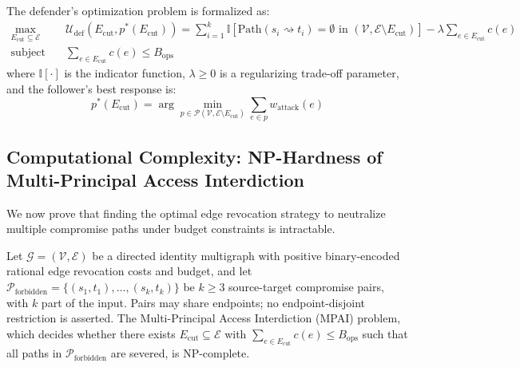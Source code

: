 The defender's optimization problem is formalized as:
\begin{align}
\max_{E_{\text{cut}} \subseteq \mathcal{E}} \quad & \mathcal{U}_{\text{def}}(E_{\text{cut}}, p^*(E_{\text{cut}})) = \sum_{i=1}^k \mathbb{I} \left[ \text{Path}(s_i \rightsquigarrow t_i) = \emptyset \text{ in } (\mathcal{V}, \mathcal{E} \setminus E_{\text{cut}}) \right] - \lambda \sum_{e \in E_{\text{cut}}} c(e) \\
\text{subject to} \quad & \sum_{e \in E_{\text{cut}}} c(e) \le B_{\text{ops}} \label{eq:budget_constraint}
\end{align}
where $\mathbb{I}[\cdot]$ is the indicator function, $\lambda \ge 0$ is a regularizing trade-off parameter, and the follower's best response is:
\begin{equation}
p^*(E_{\text{cut}}) = \arg\min_{p \in \mathcal{P}(\mathcal{V}, \mathcal{E} \setminus E_{\text{cut}})} \sum_{e \in p} w_{\text{attack}}(e)
\end{equation}

\subsection{Computational Complexity: NP-Hardness of Multi-Principal Access Interdiction}
We now prove that finding the optimal edge revocation strategy to neutralize multiple compromise paths under budget constraints is intractable.

\begin{theorem}
\label{thm:nphardness}
Let $\mathcal{G} = (\mathcal{V}, \mathcal{E})$ be a directed identity multigraph with positive binary-encoded rational edge revocation costs and budget, and let $\mathcal{P}_{\text{forbidden}} = \{(s_1, t_1), \dots, (s_k, t_k)\}$ be $k \ge 3$ source-target compromise pairs, with $k$ part of the input. Pairs may share endpoints; no endpoint-disjoint restriction is asserted. The Multi-Principal Access Interdiction (MPAI) problem, which decides whether there exists $E_{\text{cut}} \subseteq \mathcal{E}$ with $\sum_{e \in E_{\text{cut}}} c(e) \le B_{\text{ops}}$ such that all paths in $\mathcal{P}_{\text{forbidden}}$ are severed, is NP-complete.
\end{theorem}

